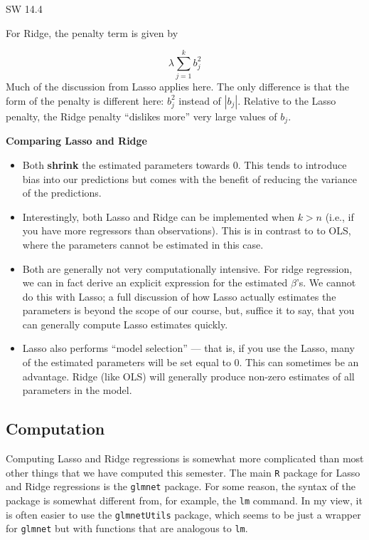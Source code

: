 \documentclass[
  letterpaper,
  DIV=11,
  numbers=noendperiod]{scrreprt}
\begin{document}
SW 14.4

For Ridge, the penalty term is given by

\[
  \lambda \sum_{j=1}^k b_j^2
\] Much of the discussion from Lasso applies here. The only difference
is that the form of the penalty is different here: \(b_j^2\) instead of
\(|b_j|\). Relative to the Lasso penalty, the Ridge penalty ``dislikes
more'' very large values of \(b_j\).

\textbf{Comparing Lasso and Ridge}

\begin{itemize}
\item
  Both \textbf{shrink} the estimated parameters towards 0. This tends to
  introduce bias into our predictions but comes with the benefit of
  reducing the variance of the predictions.
\item
  Interestingly, both Lasso and Ridge can be implemented when \(k > n\)
  (i.e., if you have more regressors than observations). This is in
  contrast to to OLS, where the parameters cannot be estimated in this
  case.
\item
  Both are generally not very computationally intensive. For ridge
  regression, we can in fact derive an explicit expression for the
  estimated \(\beta\)'s. We cannot do this with Lasso; a full discussion
  of how Lasso actually estimates the parameters is beyond the scope of
  our course, but, suffice it to say, that you can generally compute
  Lasso estimates quickly.
\item
  Lasso also performs ``model selection'' --- that is, if you use the
  Lasso, many of the estimated parameters will be set equal to 0. This
  can sometimes be an advantage. Ridge (like OLS) will generally produce
  non-zero estimates of all parameters in the model.
\end{itemize}

\subsection{Computation}\label{computation-9}

Computing Lasso and Ridge regressions is somewhat more complicated than
most other things that we have computed this semester. The main
\texttt{R} package for Lasso and Ridge regressions is the
\texttt{glmnet} package. For some reason, the syntax of the package is
somewhat different from, for example, the \texttt{lm} command. In my
view, it is often easier to use the \texttt{glmnetUtils} package, which
seems to be just a wrapper for \texttt{glmnet} but with functions that
are analogous to \texttt{lm}.
\end{document}
